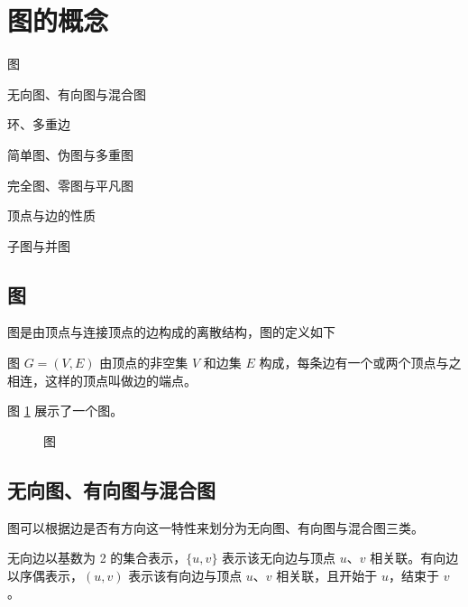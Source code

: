 \section{图的概念}
\begin{introduction}
    \item 图
    \item 无向图、有向图与混合图
    \item 环、多重边
    \item 简单图、伪图与多重图
    \item 完全图、零图与平凡图
    \item 顶点与边的性质
    \item 子图与并图
\end{introduction}

\subsection{图}
图是由顶点与连接顶点的边构成的离散结构，图的定义如下
\begin{definition}[图]\label{def:图}
    图 $G = (V, E)$ 由顶点的非空集 $V$ 和边集 $E$ 构成，每条边有一个或两个顶点与之相连，这样的顶点叫做边的端点。
\end{definition}

图 \ref{fig:图} 展示了一个图。
\begin{figure}[H]
    \centering
    \caption{图}
    \label{fig:图}
\end{figure}

\subsection{无向图、有向图与混合图}
图可以根据边是否有方向这一特性来划分为无向图、有向图与混合图三类。
\begin{definition}[有向边与无向边]\label{def:无向边与有向边}
    无向边以基数为 2 的集合表示，$\{u, v\}$ 表示该无向边与顶点 $u$、$v$ 相关联。有向边以序偶表示，$(u, v)$ 表示该有向边与顶点 $u$、$v$ 相关联，且开始于 $u$，结束于 $v$。
\end{definition}

